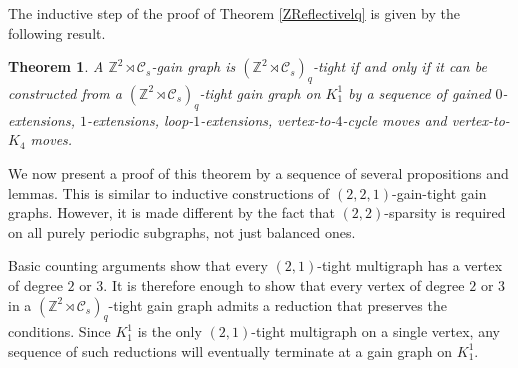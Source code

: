\documentclass[reqno,a4paper,10pt]{article}
\newtheorem{theorem}{Theorem}[section]
\theoremstyle{definition}
\theoremstyle{remark}
\numberwithin{equation}{section}
\numberwithin{figure}{section}
\numberwithin{table}{section}
\newcommand{\Z}{\mathbb{Z}}
\begin{document}
    The inductive step of the proof of Theorem \ref{ZReflectivelq} is given by the following result.
    \begin{theorem}\label{ZReflectivelqInduction}
        A $\Z^2\rtimes\mathcal{C}_s$-gain graph is $(\Z^2\rtimes\mathcal{C}_s)_q$-tight if and only if it can be constructed from a $(\Z^2\rtimes\mathcal{C}_s)_q$-tight gain graph on $K_1^1$ by a sequence of gained $0$-extensions, $1$-extensions, loop-$1$-extensions, vertex-to-$4$-cycle moves and vertex-to-$K_4$ moves.
    \end{theorem}

    We now present a proof of this theorem by a sequence of several propositions and lemmas. This is similar to inductive constructions of $(2,2,1)$-gain-tight gain graphs. However, it is made different by the fact that $(2,2)$-sparsity is required on all purely periodic subgraphs, not just balanced ones.

    Basic counting arguments show that every $(2,1)$-tight multigraph has a vertex of degree $2$ or $3$. It is therefore enough to show that every vertex of degree $2$ or $3$ in a $(\Z^2\rtimes\mathcal{C}_s)_q$-tight gain graph admits a reduction that preserves the conditions. Since $K_1^1$ is the only $(2,1)$-tight multigraph on a single vertex, any sequence of such reductions will eventually terminate at a gain graph on $K_1^1$.
\end{document}
